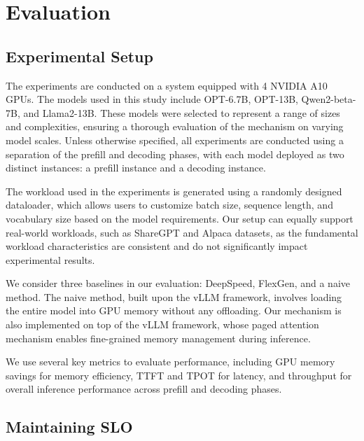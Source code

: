 \section{Evaluation}


\subsection{Experimental Setup}
\label{sec:expsetup}

The experiments are conducted on a system equipped with 4 NVIDIA A10 GPUs. 
The models used in this study include OPT-6.7B, OPT-13B, Qwen2-beta-7B, and Llama2-13B. 
These models were selected to represent a range of sizes and complexities, ensuring a thorough evaluation of the \sys mechanism on varying model scales. 
Unless otherwise specified, 
all experiments are conducted using a separation of the prefill and decoding phases, with each model deployed as two distinct instances: a prefill instance and a decoding instance.

The workload used in the experiments is generated using a randomly designed dataloader, which allows users to customize batch size, sequence length, 
and vocabulary size based on the model requirements. Our setup can equally support real-world workloads, 
such as ShareGPT\cite{sharegpt} and Alpaca\cite{alpaca1, alpaca2} datasets, as the fundamental workload characteristics are consistent and do not significantly impact experimental results.

We consider three baselines in our evaluation: DeepSpeed, FlexGen, and a naive method.
The naive method, built upon the vLLM framework, involves loading the entire model into GPU memory without any offloading. 
Our \sys mechanism is also implemented on top of the vLLM framework, whose paged attention mechanism enables fine-grained memory management during inference.

We use several key metrics to evaluate performance, 
including GPU memory savings for memory efficiency, TTFT and TPOT for latency, and throughput for overall inference performance across prefill and decoding phases.


\subsection{Maintaining SLO}

